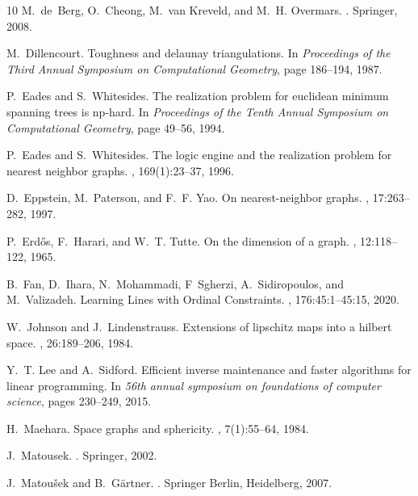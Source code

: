 \documentclass[11pt]{article}
\begin{document}
\begin{thebibliography}{10}
M.~de~Berg, O.~Cheong, M.~van Kreveld, and M.~H. Overmars.
.
\newblock Springer, 2008.

M.~Dillencourt.
\newblock Toughness and delaunay triangulations.
\newblock In {\em Proceedings of the Third Annual Symposium on Computational Geometry}, page 186–194, 1987.

P.~Eades and S.~Whitesides.
\newblock The realization problem for euclidean minimum spanning trees is np-hard.
\newblock In {\em Proceedings of the Tenth Annual Symposium on Computational Geometry}, page 49–56, 1994.

P.~Eades and S.~Whitesides.
\newblock The logic engine and the realization problem for nearest neighbor graphs.
, 169(1):23--37, 1996.

D.~Eppstein, M.~Paterson, and F.~F. Yao.
\newblock On nearest-neighbor graphs.
, 17:263--282, 1997.

P.~Erd\H{o}s, F.~Harari, and W.~T. Tutte.
\newblock On the dimension of a graph.
, 12:118--122, 1965.

B.~Fan, D.~Ihara, N.~Mohammadi, F~Sgherzi, A.~Sidiropoulos, and M.~Valizadeh.
\newblock Learning {Lines} with {Ordinal} {Constraints}.
, 176:45:1--45:15, 2020.

W.~Johnson and J.~Lindenstrauss.
\newblock Extensions of lipschitz maps into a hilbert space.
, 26:189--206, 1984.

Y.~T. Lee and A.~Sidford.
\newblock Efficient inverse maintenance and faster algorithms for linear programming.
\newblock In {\em 56th annual symposium on foundations of computer science}, pages 230--249, 2015.

H.~Maehara.
\newblock Space graphs and sphericity.
, 7(1):55--64, 1984.

J.~Matousek.
.
\newblock Springer, 2002.

J.~Matoušek and B.~Gärtner.
.
\newblock Springer Berlin, Heidelberg, 2007.


\end{thebibliography}
\end{document}

